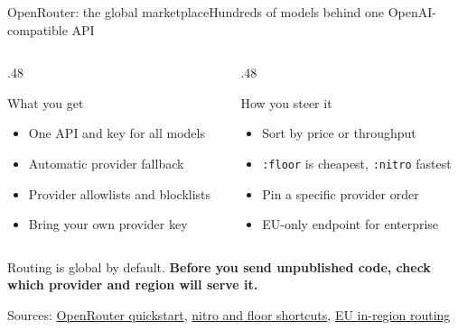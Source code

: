 \documentclass[aspectratio=169]{beamer}
\newcommand{\srcmulti}[1]{\par\vfill{\fontsize{7}{8}\selectfont\color{ACINgray}Sources: #1}}
\begin{document}
\begin{frame}{OpenRouter: the global marketplace}{Hundreds of models behind one OpenAI-compatible API}
\begin{columns}[T,onlytextwidth]
\begin{column}{.48\textwidth}
\begin{block}{What you get}
\begin{itemize}\itemsep4pt
  \item One API and key for all models
  \item Automatic provider fallback
  \item Provider allowlists and blocklists
  \item Bring your own provider key
\end{itemize}
\end{block}
\end{column}
\hfill
\begin{column}{.48\textwidth}
\begin{exampleblock}{How you steer it}
\begin{itemize}\itemsep4pt
  \item Sort by price or throughput
  \item \texttt{:floor} is cheapest, \texttt{:nitro} fastest
  \item Pin a specific provider order
  \item EU-only endpoint for enterprise
\end{itemize}
\end{exampleblock}
\end{column}
\end{columns}
\vspace{4mm}
\centering\small Routing is global by default. \textbf{Before you send unpublished code, check which provider and region will serve it.}
\srcmulti{\href{https://openrouter.ai/docs/quickstart}{OpenRouter quickstart}, \href{https://openrouter.ai/announcements/introducing-nitro-and-floor-price-shortcuts}{nitro and floor shortcuts}, \href{https://openrouter.ai/docs/guides/get-started/sovereign-ai}{EU in-region routing}}
\end{frame}
\end{document}
